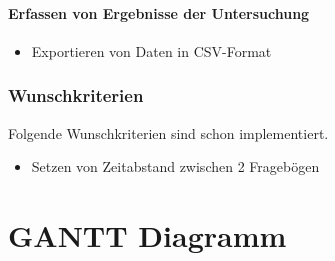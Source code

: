 \documentclass[a4paper]{scrreprt}
\begin{document}
                        \subsubsection{Erfassen von Ergebnisse der Untersuchung}
                            \begin{itemize}
                                \item Exportieren von Daten in CSV-Format
                            \end{itemize}
                        \vspace*{0.5cm}
                \subsection{Wunschkriterien}
                \par
                Folgende Wunschkriterien sind schon implementiert. 
                        \begin{itemize}
                            \item Setzen von Zeitabstand zwischen 2 Frageb\"ogen
                        \end{itemize}
                        \vspace*{0.5cm}


           \newpage
    \chapter{GANTT Diagramm}
\end{document}
